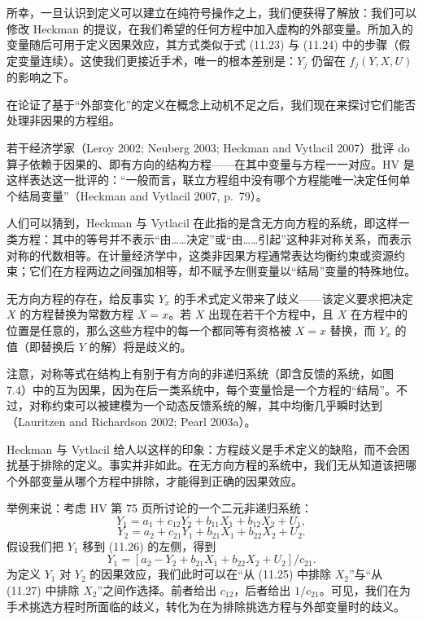 所幸，一旦认识到定义可以建立在纯符号操作之上，我们便获得了解放：我们可以修改 Heckman 的提议，在我们希望的任何方程中加入虚构的外部变量。所加入的变量随后可用于定义因果效应，其方式类似于式 \textup{(11.23)} 与 \textup{(11.24)} 中的步骤（假定变量连续）。这使我们更接近手术，唯一的根本差别是：$Y_j$ 仍留在 $f_j(Y,X,U)$ 的影响之下。

在论证了基于“外部变化”的定义在概念上动机不足之后，我们现在来探讨它们能否处理非因果的方程组。


若干经济学家（Leroy 2002; Neuberg 2003; Heckman and Vytlacil 2007）批评 do 算子依赖于因果的、即有方向的结构方程——在其中变量与方程一一对应。HV 是这样表达这一批评的：“一般而言，联立方程组中没有哪个方程能唯一决定任何单个结局变量”（Heckman and Vytlacil 2007, p.~79）。

人们可以猜到，Heckman 与 Vytlacil 在此指的是含无方向方程的系统，即这样一类方程：其中的等号并不表示“由……决定”或“由……引起”这种非对称关系，而表示对称的代数相等。在计量经济学中，这类非因果方程通常表达均衡约束或资源约束；它们在方程两边之间强加相等，却不赋予左侧变量以“结局”变量的特殊地位。

无方向方程的存在，给反事实 $Y_x$ 的手术式定义带来了歧义——该定义要求把决定 $X$ 的方程替换为常数方程 $X=x$。若 $X$ 出现在若干个方程中，且 $X$ 在方程中的位置是任意的，那么这些方程中的每一个都同等有资格被 $X=x$ 替换，而 $Y_x$ 的值（即替换后 $Y$ 的解）将是歧义的。

注意，对称等式在结构上有别于有方向的非递归系统（即含反馈的系统，如图 7.4）中的互为因果，因为在后一类系统中，每个变量恰是一个方程的“结局”。不过，对称约束可以被建模为一个动态反馈系统的解，其中均衡几乎瞬时达到（Lauritzen and Richardson 2002; Pearl 2003a）。

Heckman 与 Vytlacil 给人以这样的印象：方程歧义是手术定义的缺陷，而不会困扰基于排除的定义。事实并非如此。在无方向方程的系统中，我们无从知道该把哪个外部变量从哪个方程中排除，才能得到正确的因果效应。

举例来说：考虑 HV 第 75 页所讨论的一个二元非递归系统：
\begin{equation}
Y_1=a_1+c_{12}Y_2+b_{11}X_1+b_{12}X_2+U_1, \tag{11.25}
\end{equation}
\begin{equation}
Y_2=a_2+c_{21}Y_1+b_{21}X_1+b_{22}X_2+U_2. \tag{11.26}
\end{equation}
假设我们把 $Y_1$ 移到 \textup{(11.26)} 的左侧，得到
\begin{equation}
Y_1=[a_2-Y_2+b_{21}X_1+b_{22}X_2+U_2]/c_{21}. \tag{11.27}
\end{equation}
为定义 $Y_1$ 对 $Y_2$ 的因果效应，我们此时可以在“从 \textup{(11.25)} 中排除 $X_2$”与“从 \textup{(11.27)} 中排除 $X_2$”之间作选择。前者给出 $c_{12}$，后者给出 $1/c_{21}$。可见，我们在为手术挑选方程时所面临的歧义，转化为在为排除挑选方程与外部变量时的歧义。


